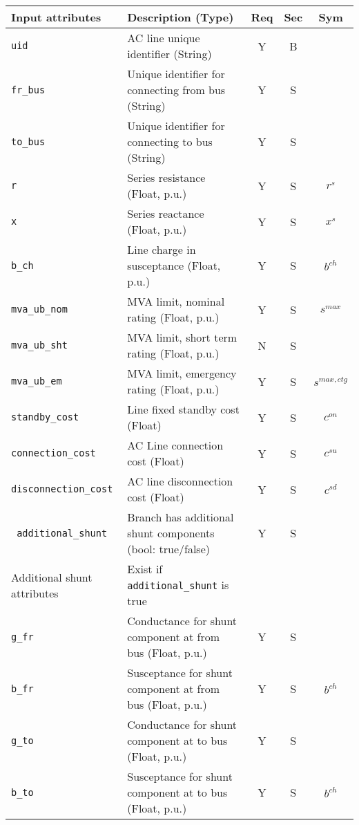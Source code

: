 \documentclass{article}
\begin{document}
\begin{center}
\small
\begin{tabular}{ l | l | c | c | c | }
Input attributes & Description (Type)& Req & Sec & Sym\\
\hline
  {\tt uid} & AC line unique identifier (String)& Y & B &  \\
  {\tt fr\_bus} & Unique identifier for connecting from bus (String)& Y & S & \\
  {\tt to\_bus} & Unique identifier for connecting to bus (String)& Y & S & \\
  {\tt r} & Series resistance (Float, p.u.)& Y & S & $r^{s}$\\
  {\tt x} & Series reactance  (Float, p.u.)& Y & S & $x^{s}$\\
  {\tt b\_ch} & Line charge in susceptance (Float, p.u.)& Y & S & $b^{ch}$\\   
  {\tt mva\_ub\_nom} & MVA limit, nominal rating (Float, p.u.)& Y & S & $s^{max}$\\
  {\tt mva\_ub\_sht} & MVA limit, short term rating (Float, p.u.)& N & S & \\
  {\tt mva\_ub\_em} & MVA limit, emergency rating (Float, p.u.)& Y & S & $s^{max,ctg}$\\  
  {\tt standby\_cost} & Line fixed standby cost (Float) & Y & S & $c^{on}$\\
  {\tt connection\_cost} &  AC Line connection cost (Float) & Y & S & $c^{su}$\\ 
  {\tt disconnection\_cost} & AC line disconnection cost (Float) & Y & S & $c^{sd}$\\
  {\tt\color{red} additional\_shunt} & Branch has additional shunt components (bool: true/false)& Y & S & \\
  \hline
  Additional shunt attributes & Exist if {\tt additional\_shunt} is true &  & & \\
  \hline
  {\tt g\_fr} & Conductance for shunt component at from bus (Float, p.u.)& Y & S & \\
  {\tt b\_fr} & Susceptance for shunt component at from bus (Float, p.u.)& Y & S & $b^{ch}$\\
  {\tt g\_to} & Conductance for shunt component at to bus (Float, p.u.)& Y & S & \\
  {\tt b\_to} & Susceptance for shunt component at to bus (Float, p.u.)& Y & S & $b^{ch}$\\
  \hline
\end{tabular}
\end{center}
\end{document}
